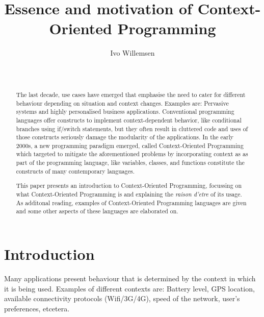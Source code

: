 \documentclass{acm_proc_article-sp}
\begin{document}
\title{Essence and motivation of Context-Oriented Programming}

%
\author{
%
\alignauthor
Ivo Willemsen\\
       \\
       \\
}

\maketitle
\begin{abstract}
The last decade, use cases have emerged that emphasise the need to cater for different behaviour depending on situation and context changes. Examples are: Pervasive systems \cite{pervasivecomputing} and highly personalised business applications. Conventional programming languages offer constructs to implement context-dependent behavior, like  conditional branches using if/switch statements, but they often result in cluttered code and uses of those 
constructs seriously damage the modularity of the applications. In the early 2000s, a new programming paradigm emerged, called Context-Oriented Programming which targeted to mitigate the aforementioned problems by incorporating context as as part of the programming language, like variables, classes, and functions constitute the constructs 
of many contemporary languages.

This paper presents an introduction to Context-Oriented Programming, focussing on what Context-Oriented Programming is and explaining the \textit{raison d'etre} of its usage. As additonal reading, examples of Context-Oriented Programming languages are given and some other aspects of these languages are elaborated on.  
\end{abstract}


\section{Introduction} \label{introduction}
Many applications present behaviour that is determined by the context in which it is being used. Examples of different contexts are: Battery level, GPS location, available connectivity protocols (Wifi/3G/4G), speed of the network, user's preferences, etcetera.
\end{document}
